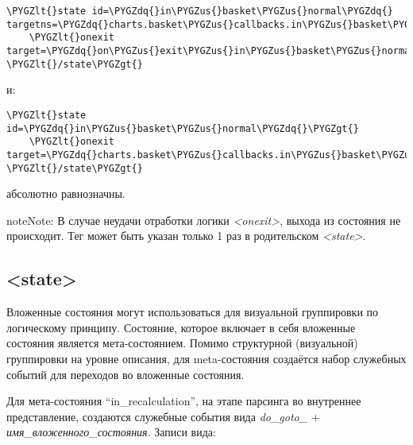 \documentclass[letterpaper,10pt,english]{sphinxmanual}
\def\PYGZus{\char`\_}
\def\PYGZlt{\char`\<}
\def\PYGZgt{\char`\>}
\def\PYGZdq{\char`\"}
\begin{document}
\begin{Verbatim}[commandchars=\\\{\}]
\PYGZlt{}state id=\PYGZdq{}in\PYGZus{}basket\PYGZus{}normal\PYGZdq{} targetns=\PYGZdq{}charts.basket\PYGZus{}callbacks.in\PYGZus{}basket\PYGZus{}normal\PYGZdq{}\PYGZgt{}
    \PYGZlt{}onexit target=\PYGZdq{}on\PYGZus{}exit\PYGZus{}in\PYGZus{}basket\PYGZus{}normal\PYGZdq{}/\PYGZgt{}
\PYGZlt{}/state\PYGZgt{}
\end{Verbatim}

и:

\begin{Verbatim}[commandchars=\\\{\}]
\PYGZlt{}state id=\PYGZdq{}in\PYGZus{}basket\PYGZus{}normal\PYGZdq{}\PYGZgt{}
    \PYGZlt{}onexit target=\PYGZdq{}charts.basket\PYGZus{}callbacks.in\PYGZus{}basket\PYGZus{}normal.on\PYGZus{}exit\PYGZus{}in\PYGZus{}basket\PYGZus{}normal\PYGZdq{}/\PYGZgt{}
\PYGZlt{}/state\PYGZgt{}
\end{Verbatim}

абсолютно равнозначны.

\begin{notice}{note}{Note:}
В случае неудачи отработки логики \emph{\textless{}onexit\textgreater{}}, выхода из состояния не происходит. Тег может быть указан только 1 раз в родительском \emph{\textless{}state\textgreater{}}.
\end{notice}


\subsection{\textless{}state\textgreater{}}
\label{xml_format:id2}
Вложенные состояния могут использоваться для визуальной группировки по логическому принципу. Состояние, которое включает в себя вложенные состояния является мета-состоянием. Помимо структурной (визуальной) группировки на уровне описания, для meta-состояния создаётся набор служебных событий для переходов во вложенные состояния.

Для мета-состояния ``in\_recalculation'', на этапе парсинга во внутреннее представление, создаются служебные события вида \emph{do\_goto\_} + \emph{имя\_вложенного\_состояния}. Записи вида:
\end{document}
